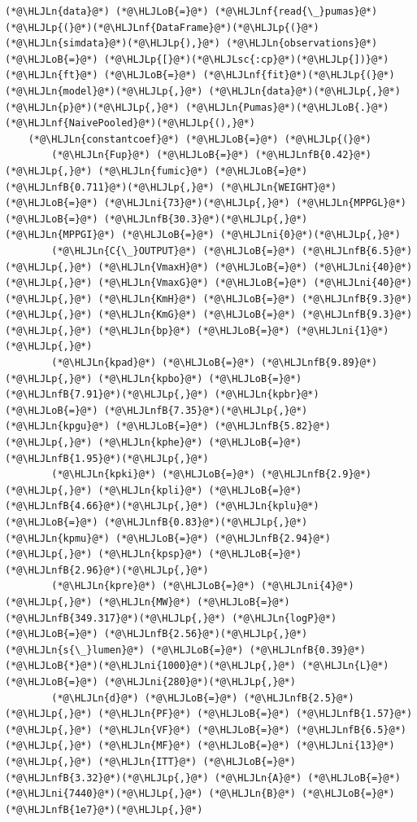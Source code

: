 \documentclass[12pt,a4paper]{article}
\newcommand{\HLJLn}[1]{#1}
\newcommand{\HLJLnf}[1]{\textcolor[RGB]{66,102,213}{#1}}
\newcommand{\HLJLsc}[1]{\textcolor[RGB]{201,61,57}{#1}}
\newcommand{\HLJLnfB}[1]{\textcolor[RGB]{59,151,46}{#1}}
\newcommand{\HLJLni}[1]{\textcolor[RGB]{59,151,46}{#1}}
\newcommand{\HLJLoB}[1]{\textcolor[RGB]{102,102,102}{\textbf{#1}}}
\newcommand{\HLJLp}[1]{#1}
\begin{document}
\begin{lstlisting}
(*@\HLJLn{data}@*) (*@\HLJLoB{=}@*) (*@\HLJLnf{read{\_}pumas}@*)(*@\HLJLp{(}@*)(*@\HLJLnf{DataFrame}@*)(*@\HLJLp{(}@*)(*@\HLJLn{simdata}@*)(*@\HLJLp{),}@*) (*@\HLJLn{observations}@*) (*@\HLJLoB{=}@*) (*@\HLJLp{[}@*)(*@\HLJLsc{:cp}@*)(*@\HLJLp{])}@*)
(*@\HLJLn{ft}@*) (*@\HLJLoB{=}@*) (*@\HLJLnf{fit}@*)(*@\HLJLp{(}@*)(*@\HLJLn{model}@*)(*@\HLJLp{,}@*) (*@\HLJLn{data}@*)(*@\HLJLp{,}@*) (*@\HLJLn{p}@*)(*@\HLJLp{,}@*) (*@\HLJLn{Pumas}@*)(*@\HLJLoB{.}@*)(*@\HLJLnf{NaivePooled}@*)(*@\HLJLp{(),}@*)
    (*@\HLJLn{constantcoef}@*) (*@\HLJLoB{=}@*) (*@\HLJLp{(}@*)
        (*@\HLJLn{Fup}@*) (*@\HLJLoB{=}@*) (*@\HLJLnfB{0.42}@*)(*@\HLJLp{,}@*) (*@\HLJLn{fumic}@*) (*@\HLJLoB{=}@*) (*@\HLJLnfB{0.711}@*)(*@\HLJLp{,}@*) (*@\HLJLn{WEIGHT}@*) (*@\HLJLoB{=}@*) (*@\HLJLni{73}@*)(*@\HLJLp{,}@*) (*@\HLJLn{MPPGL}@*) (*@\HLJLoB{=}@*) (*@\HLJLnfB{30.3}@*)(*@\HLJLp{,}@*) (*@\HLJLn{MPPGI}@*) (*@\HLJLoB{=}@*) (*@\HLJLni{0}@*)(*@\HLJLp{,}@*)
        (*@\HLJLn{C{\_}OUTPUT}@*) (*@\HLJLoB{=}@*) (*@\HLJLnfB{6.5}@*)(*@\HLJLp{,}@*) (*@\HLJLn{VmaxH}@*) (*@\HLJLoB{=}@*) (*@\HLJLni{40}@*)(*@\HLJLp{,}@*) (*@\HLJLn{VmaxG}@*) (*@\HLJLoB{=}@*) (*@\HLJLni{40}@*)(*@\HLJLp{,}@*) (*@\HLJLn{KmH}@*) (*@\HLJLoB{=}@*) (*@\HLJLnfB{9.3}@*)(*@\HLJLp{,}@*) (*@\HLJLn{KmG}@*) (*@\HLJLoB{=}@*) (*@\HLJLnfB{9.3}@*)(*@\HLJLp{,}@*) (*@\HLJLn{bp}@*) (*@\HLJLoB{=}@*) (*@\HLJLni{1}@*)(*@\HLJLp{,}@*)
        (*@\HLJLn{kpad}@*) (*@\HLJLoB{=}@*) (*@\HLJLnfB{9.89}@*)(*@\HLJLp{,}@*) (*@\HLJLn{kpbo}@*) (*@\HLJLoB{=}@*) (*@\HLJLnfB{7.91}@*)(*@\HLJLp{,}@*) (*@\HLJLn{kpbr}@*) (*@\HLJLoB{=}@*) (*@\HLJLnfB{7.35}@*)(*@\HLJLp{,}@*) (*@\HLJLn{kpgu}@*) (*@\HLJLoB{=}@*) (*@\HLJLnfB{5.82}@*)(*@\HLJLp{,}@*) (*@\HLJLn{kphe}@*) (*@\HLJLoB{=}@*) (*@\HLJLnfB{1.95}@*)(*@\HLJLp{,}@*)
        (*@\HLJLn{kpki}@*) (*@\HLJLoB{=}@*) (*@\HLJLnfB{2.9}@*)(*@\HLJLp{,}@*) (*@\HLJLn{kpli}@*) (*@\HLJLoB{=}@*) (*@\HLJLnfB{4.66}@*)(*@\HLJLp{,}@*) (*@\HLJLn{kplu}@*) (*@\HLJLoB{=}@*) (*@\HLJLnfB{0.83}@*)(*@\HLJLp{,}@*) (*@\HLJLn{kpmu}@*) (*@\HLJLoB{=}@*) (*@\HLJLnfB{2.94}@*)(*@\HLJLp{,}@*) (*@\HLJLn{kpsp}@*) (*@\HLJLoB{=}@*) (*@\HLJLnfB{2.96}@*)(*@\HLJLp{,}@*)
        (*@\HLJLn{kpre}@*) (*@\HLJLoB{=}@*) (*@\HLJLni{4}@*)(*@\HLJLp{,}@*) (*@\HLJLn{MW}@*) (*@\HLJLoB{=}@*) (*@\HLJLnfB{349.317}@*)(*@\HLJLp{,}@*) (*@\HLJLn{logP}@*) (*@\HLJLoB{=}@*) (*@\HLJLnfB{2.56}@*)(*@\HLJLp{,}@*) (*@\HLJLn{s{\_}lumen}@*) (*@\HLJLoB{=}@*) (*@\HLJLnfB{0.39}@*)(*@\HLJLoB{*}@*)(*@\HLJLni{1000}@*)(*@\HLJLp{,}@*) (*@\HLJLn{L}@*) (*@\HLJLoB{=}@*) (*@\HLJLni{280}@*)(*@\HLJLp{,}@*)
        (*@\HLJLn{d}@*) (*@\HLJLoB{=}@*) (*@\HLJLnfB{2.5}@*)(*@\HLJLp{,}@*) (*@\HLJLn{PF}@*) (*@\HLJLoB{=}@*) (*@\HLJLnfB{1.57}@*)(*@\HLJLp{,}@*) (*@\HLJLn{VF}@*) (*@\HLJLoB{=}@*) (*@\HLJLnfB{6.5}@*)(*@\HLJLp{,}@*) (*@\HLJLn{MF}@*) (*@\HLJLoB{=}@*) (*@\HLJLni{13}@*)(*@\HLJLp{,}@*) (*@\HLJLn{ITT}@*) (*@\HLJLoB{=}@*) (*@\HLJLnfB{3.32}@*)(*@\HLJLp{,}@*) (*@\HLJLn{A}@*) (*@\HLJLoB{=}@*) (*@\HLJLni{7440}@*)(*@\HLJLp{,}@*) (*@\HLJLn{B}@*) (*@\HLJLoB{=}@*) (*@\HLJLnfB{1e7}@*)(*@\HLJLp{,}@*)

\end{lstlisting}
\end{document}
